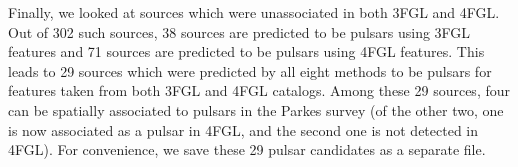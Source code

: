 Finally, we looked at sources which were unassociated in both 3FGL and 4FGL. Out of 302 such sources, 38 sources are predicted to be pulsars using 3FGL features and 71 sources are predicted to be pulsars using 4FGL features. This leads to 29 sources which were predicted by all eight methods to be pulsars for features taken from both 3FGL and 4FGL catalogs. Among these 29 sources, four can be spatially associated to pulsars in the Parkes survey (of the other two, one is now associated as a pulsar in 4FGL, and the second one is not detected in 4FGL).  For convenience, we save these 29 pulsar candidates as a separate file.



